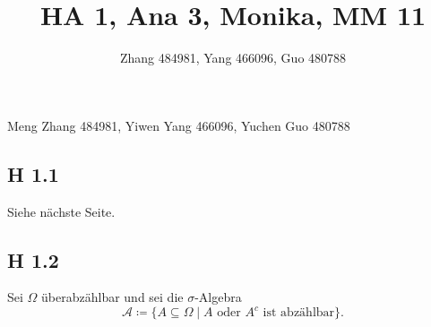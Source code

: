 \documentclass[draft,a5paper]{article}
\title{HA 1, Ana 3, Monika, MM 11}
\author{Zhang 484981, Yang 466096, Guo 480788}
\theoremstyle{remark}
\begin{document}
\maketitle
\begin{center}
  Meng Zhang 484981, Yiwen Yang 466096, Yuchen Guo 480788
\end{center}

\newpage

\subsection{H 1.1}
Siehe nächste Seite.
\newpage
\subsection{H 1.2}
Sei \(\Omega\) überabzählbar und sei die \(\sigma\)-Algebra
\[\mathcal{A} \coloneq \{A \subseteq \Omega \mid A \text{ oder } A^{c} \text{ ist abzählbar}\}.\]
\end{document}
